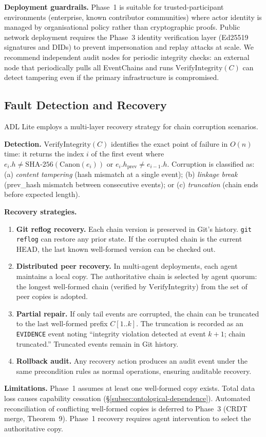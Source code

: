 \textbf{Deployment guardrails.} Phase~1 is suitable for trusted-participant environments (enterprise, known contributor communities) where actor identity is managed by organisational policy rather than cryptographic proofs. Public network deployment requires the Phase~3 identity verification layer (Ed25519 signatures and DIDs) to prevent impersonation and replay attacks at scale. We recommend independent audit nodes for periodic integrity checks: an external node that periodically pulls all EventChains and runs $\text{VerifyIntegrity}(C)$ can detect tampering even if the primary infrastructure is compromised.

\subsection{Fault Detection and Recovery}

ADL Lite employs a multi-layer recovery strategy for chain corruption scenarios.

\textbf{Detection.} $\text{VerifyIntegrity}(C)$ identifies the exact point of failure in $O(n)$ time: it returns the index $i$ of the first event where $e_i.h \neq \text{SHA-256}(\text{Canon}(e_i))$ or $e_i.h_{\text{prev}} \neq e_{i-1}.h$. Corruption is classified as: (a) \emph{content tampering} (hash mismatch at a single event); (b) \emph{linkage break} (prev\_hash mismatch between consecutive events); or (c) \emph{truncation} (chain ends before expected length).

\textbf{Recovery strategies.}
\begin{enumerate}[label=(\arabic*)]
    \item \textbf{Git reflog recovery.} Each chain version is preserved in Git's history. \texttt{git reflog} can restore any prior state. If the corrupted chain is the current HEAD, the last known well-formed version can be checked out.
    \item \textbf{Distributed peer recovery.} In multi-agent deployments, each agent maintains a local copy. The authoritative chain is selected by agent quorum: the longest well-formed chain (verified by $\text{VerifyIntegrity}$) from the set of peer copies is adopted.
    \item \textbf{Partial repair.} If only tail events are corrupted, the chain can be truncated to the last well-formed prefix $C[1..k]$. The truncation is recorded as an \texttt{EVIDENCE} event noting ``integrity violation detected at event $k+1$; chain truncated.'' Truncated events remain in Git history.
    \item \textbf{Rollback audit.} Any recovery action produces an audit event under the same precondition rules as normal operations, ensuring auditable recovery.
\end{enumerate}

\textbf{Limitations.} Phase~1 assumes at least one well-formed copy exists. Total data loss causes capability cessation (\S\ref{subsec:ontological-dependence}). Automated reconciliation of conflicting well-formed copies is deferred to Phase~3 (CRDT merge, Theorem~9). Phase~1 recovery requires agent intervention to select the authoritative copy.
